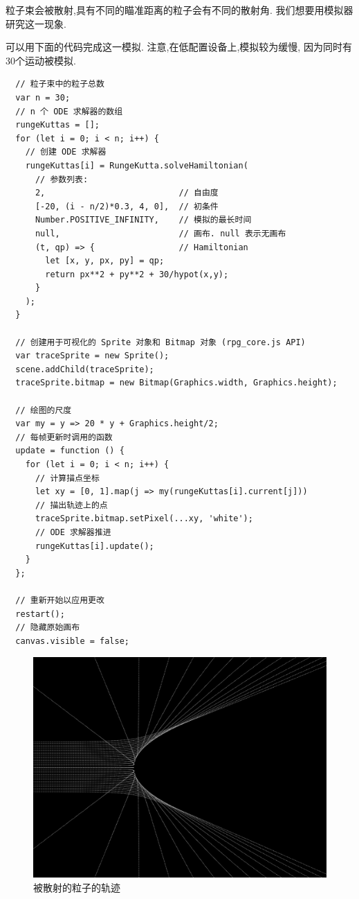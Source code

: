 \documentclass[12pt]{article}
\begin{document}
粒子束会被散射,具有不同的瞄准距离的粒子会有不同的散射角\cite[p. 49]{landau1976mechanics}.
我们想要用模拟器研究这一现象.

可以用下面的代码完成这一模拟.
注意,在低配置设备上,模拟较为缓慢,
因为同时有30个运动被模拟.

\begin{verbatim}
  // 粒子束中的粒子总数
  var n = 30;
  // n 个 ODE 求解器的数组
  rungeKuttas = [];
  for (let i = 0; i < n; i++) {
    // 创建 ODE 求解器
    rungeKuttas[i] = RungeKutta.solveHamiltonian(
      // 参数列表:
      2,                           // 自由度
      [-20, (i - n/2)*0.3, 4, 0],  // 初条件
      Number.POSITIVE_INFINITY,    // 模拟的最长时间
      null,                        // 画布. null 表示无画布
      (t, qp) => {                 // Hamiltonian
        let [x, y, px, py] = qp;
        return px**2 + py**2 + 30/hypot(x,y);
      }
    );
  }

  // 创建用于可视化的 Sprite 对象和 Bitmap 对象 (rpg_core.js API)
  var traceSprite = new Sprite();
  scene.addChild(traceSprite);
  traceSprite.bitmap = new Bitmap(Graphics.width, Graphics.height);

  // 绘图的尺度
  var my = y => 20 * y + Graphics.height/2;
  // 每帧更新时调用的函数
  update = function () {
    for (let i = 0; i < n; i++) {
      // 计算描点坐标
      let xy = [0, 1].map(j => my(rungeKuttas[i].current[j]))
      // 描出轨迹上的点
      traceSprite.bitmap.setPixel(...xy, 'white');
      // ODE 求解器推进
      rungeKuttas[i].update();
    }
  };

  // 重新开始以应用更改
  restart();
  // 隐藏原始画布
  canvas.visible = false;
\end{verbatim}

\begin{figure}[h]
  \centering
  \includegraphics[width=0.8\linewidth]{scatter.png}
  \caption{被散射的粒子的轨迹}
  \label{fig:scatter}
\end{figure}
\end{document}

